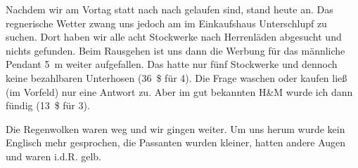 Nachdem wir am Vortag statt nach  nach  gelaufen sind, stand heute  an.
Das regnerische Wetter zwang uns jedoch am  im Einkaufshaus  Unterschlupf zu suchen.
Dort haben wir alle acht Stockwerke nach Herrenläden abgesucht und nichts gefunden.
Beim Rausgehen ist uns dann die Werbung für das männliche Pendant 5~m weiter aufgefallen.
Das hatte nur fünf Stockwerke und dennoch keine bezahlbaren Unterhosen (36~\$ für 4).
Die Frage waschen oder kaufen ließ (im Vorfeld) nur eine Antwort zu.
Aber im gut bekannten H\&M wurde ich dann fündig (13~\$ für 3).

Die Regenwolken waren weg und wir gingen weiter.
Um uns herum wurde kein Englisch mehr gesprochen, die Passanten wurden kleiner, hatten andere Augen und waren i.d.R. gelb.
